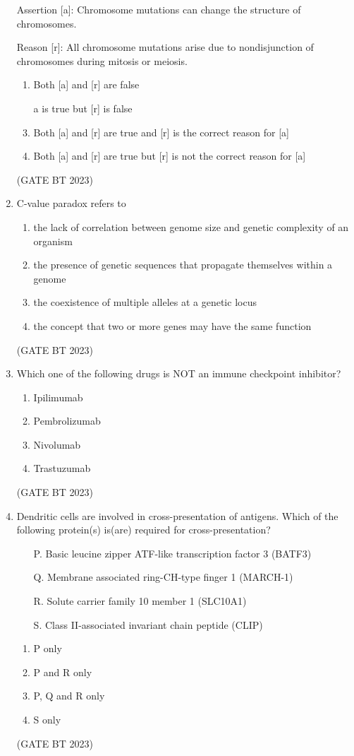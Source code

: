 \documentclass[journal,12pt,onecolumn]{IEEEtran}
\begin{document}
\begin{enumerate}
    Assertion [a]: Chromosome mutations can change the structure of chromosomes.
    
    Reason [r]: All chromosome mutations arise due to nondisjunction of chromosomes during mitosis or meiosis.
    \begin{enumerate}
        \item Both [a] and [r] are false
        \item [a] is true but [r] is false
        \item Both [a] and [r] are true and [r] is the correct reason for [a]
        \item Both [a] and [r] are true but [r] is not the correct reason for [a]
    \end{enumerate}
    \hfill(GATE BT 2023)

    \item C-value paradox refers to
    \begin{enumerate}
        \item the lack of correlation between genome size and genetic complexity of an organism
        \item the presence of genetic sequences that propagate themselves within a genome
        \item the coexistence of multiple alleles at a genetic locus
        \item the concept that two or more genes may have the same function
    \end{enumerate}
    \hfill(GATE BT 2023)

    \item Which one of the following drugs is NOT an immune checkpoint inhibitor?
    \begin{enumerate}
        \item Ipilimumab
        \item Pembrolizumab
        \item Nivolumab
        \item Trastuzumab
    \end{enumerate}
    \hfill(GATE BT 2023)

    \item Dendritic cells are involved in cross-presentation of antigens. Which of the following protein(s) is(are) required for cross-presentation? 
    \begin{enumerate}
        \item[P.] Basic leucine zipper ATF-like transcription factor 3 (BATF3)
        \item[Q.] Membrane associated ring-CH-type finger 1 (MARCH-1)
        \item[R.] Solute carrier family 10 member 1 (SLC10A1)
        \item[S.] Class II-associated invariant chain peptide (CLIP)
    \end{enumerate}
    \begin{enumerate}
        \item P only
        \item P and R only
        \item P, Q and R only
        \item S only
    \end{enumerate}
    \hfill(GATE BT 2023)


\end{enumerate}
\end{document}
